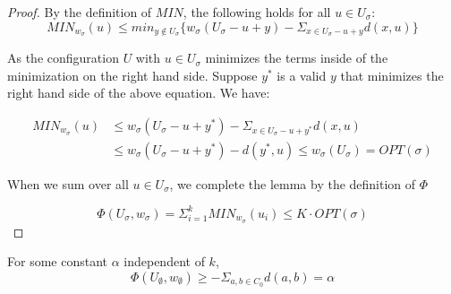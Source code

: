 \begin{proof}
     By the definition of $MIN$, the following holds for all $u \in U_\sigma$:
     \begin{equation*}
        MIN_{w_\sigma}(u) \leq min_{y \not \in U_\sigma} \{ w_\sigma(U_\sigma - u + y) - \Sigma_{x \in U_\sigma - u + y} d(x, u)\}
     \end{equation*}

     As the configuration $U$ with $u \in U_\sigma$ minimizes the terms inside of the minimization on the right hand side. Suppose $y^*$ is a valid $y$ that minimizes the right hand side of the above equation. We have:
     
     \begin{equation*}
        \begin{split}
            MIN_{w_\sigma}(u) &\leq w_\sigma(U_\sigma - u + y^*) - \Sigma_{x \in U_\sigma - u + y^*} d(x, u) \\
            &\leq w_\sigma(U_\sigma - u + y^*) - d(y^*, u) \leq w_\sigma(U_\sigma) = OPT(\sigma)
        \end{split}
     \end{equation*}

     When we sum over all $u \in U_\sigma$, we complete the lemma by the definition of $\Phi$
     
     \begin{equation*}
        \Phi(U_\sigma, w_\sigma) = \Sigma_{i=1}^k MIN_{w_\sigma}(u_i) \leq K \cdot  OPT(\sigma)
     \end{equation*}
\end{proof}

\begin{lemma}
    \label{lem:er2}
    For some constant $\alpha$ independent of $k$,
    \begin{equation*}
        \Phi(U_\emptyset, w_\emptyset) \geq - \Sigma_{a, b \in C_0} d(a, b) = \alpha
    \end{equation*}
\end{lemma}

